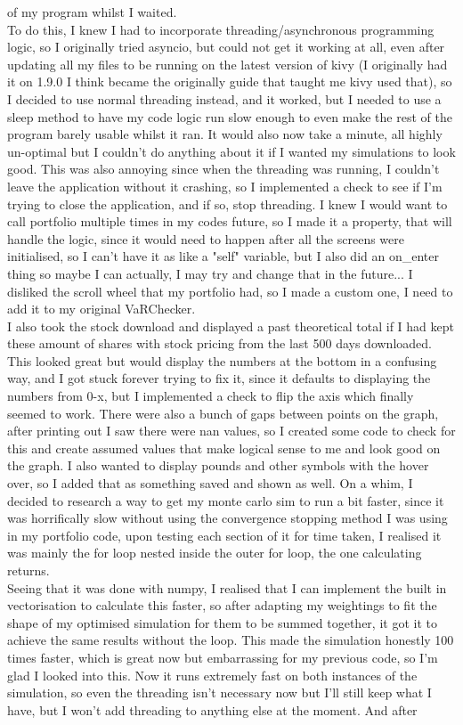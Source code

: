 \documentclass{article}
\begin{document}
of my program whilst I waited. \\To do this, I knew I had to incorporate threading/asynchronous programming\\ logic, so I originally tried asyncio, but could not get it working at all, even after updating all my files to be running on the latest version of kivy (I originally had it on 1.9.0 I think became the originally guide that taught me kivy used that), so I decided to use normal threading instead, and it worked, but I needed to use a sleep method to have my code logic run slow enough to even make the rest of the program barely usable whilst it ran. It would also now take a minute, all highly un-optimal but I couldn't do anything about it if I wanted my simulations to look good. This was also annoying since when the threading was running, I couldn't leave the application without it crashing, so I implemented a check to see if I'm trying to close the application, and if so, stop threading. I knew I would want to call portfolio multiple times in my codes future, so I made it a property, that will handle the logic, since it would need to happen after all the screens were initialised, so I can't have it as like a "self" variable, but I also did an on\_enter thing so maybe I can actually, I may try and change that in the future... I disliked the scroll wheel that my portfolio had, so I made a custom one, I need to add it to my original VaRChecker. \\I also took the stock download and displayed a past theoretical total if I had kept these amount of shares with stock pricing from the last 500 days downloaded. This looked great but would display the numbers at the bottom in a confusing way, and I got stuck forever trying to fix it, since it defaults to displaying the numbers from 0-x, but I implemented a check to flip the axis which finally seemed to work. There were also a bunch of gaps between points on the graph, after printing out I saw there were nan values, so I created some code to check for this and create assumed values that make logical sense to me and look good on the graph. I also wanted to display pounds and other symbols with the hover over, so I added that as something saved and shown as well. On a whim, I decided to research a way to get my monte carlo sim to run a bit faster, since it was horrifically slow without using the convergence stopping method I was using in my portfolio code, upon testing each section of it for time taken, I realised it was mainly the for loop nested inside the outer for loop, the one calculating returns. \\Seeing that it was done with numpy, I realised that I can implement the built in vectorisation to calculate this faster, so after adapting my weightings to fit the shape of my optimised simulation for them to be summed together, it got it to achieve the same results without the loop. This made the simulation honestly 100 times faster, which is great now but embarrassing for my previous code, so I'm glad I looked into this. Now it runs extremely fast on both instances of the simulation, so even the threading isn't necessary now but I'll still keep what I have, but I won't add threading to anything else at the moment. And after 
\end{document}
